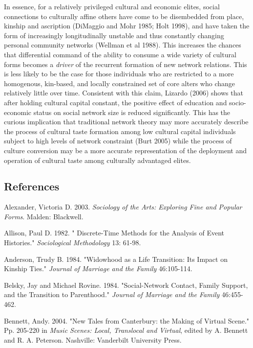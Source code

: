 In essence, for a relatively privileged cultural and economic elites, social connections to culturally affine others have come to be disembedded from place, kinship and ascription (DiMaggio and Mohr 1985; Holt 1998), and have taken the form of increasingly longitudinally unstable and thus constantly changing personal community networks (Wellman et al 1988). This increases the chances that differential command of the ability to consume a wide variety of cultural forms becomes a \emph{driver} of the recurrent formation of new network relations. This is less likely to be the case for those individuals who are restricted to a more homogenous, kin-based, and locally constrained set of core alters who change relatively little over time. Consistent with this claim, Lizardo (2006) shows that after holding cultural capital constant, the positive effect of education and socio-economic status on social network size is reduced significantly. This has the curious implication that traditional network theory may more accurately describe the process of cultural taste formation among low cultural capital individuals subject to high levels of network constraint (Burt 2005) while the process of culture conversion may be a more accurate representation of the deployment and operation of cultural taste among culturally advantaged elites.

\subsection{References}\label{references}

Alexander, Victoria D. 2003. \emph{Sociology of the Arts: Exploring Fine and Popular Forms}. Malden: Blackwell.

Allison, Paul D. 1982. " Discrete-Time Methods for the Analysis of Event Histories." \emph{Sociological Methodology} 13: 61-98.

Anderson, Trudy B. 1984. "Widowhood as a Life Transition: Its Impact on Kinship Ties." \emph{Journal of Marriage and the Family} 46:105-114.

Belsky, Jay and Michael Rovine. 1984. "Social-Network Contact, Family Support, and the Transition to Parenthood." \emph{Journal of Marriage and the Family} 46:455-462.

Bennett, Andy. 2004. "New Tales from Canterbury: the Making of Virtual Scene." Pp. 205-220 in \emph{Music Scenes: Local, Translocal and Virtual}, edited by A. Bennett and R. A. Peterson. Nashville: Vanderbilt University Press.

